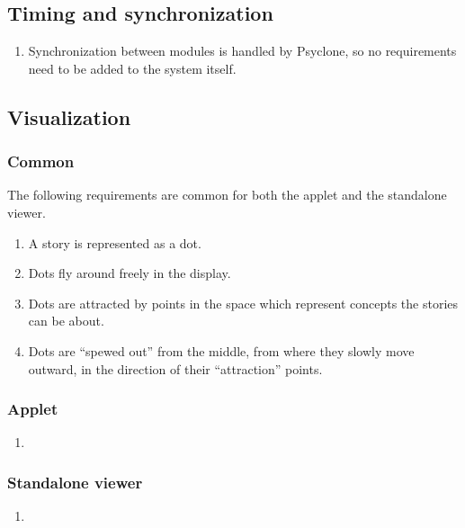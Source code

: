 \subsection{Timing and synchronization}

\begin{enumerate}
  \item Synchronization between modules is handled by Psyclone, so no
        requirements need to be added to the system itself.
\end{enumerate}

\subsection{Visualization}

\subsubsection{Common}

The following requirements are common for both the applet and the standalone
viewer.

\begin{enumerate}
  \item A story is represented as a dot.
  \item Dots fly around freely in the display.
  \item Dots are attracted by points in the space which represent concepts the
        stories can be about.
  \item Dots are ``spewed out'' from the middle, from where they slowly move
        outward, in the direction of their ``attraction'' points.
\end{enumerate}

\subsubsection{Applet}

\begin{enumerate}
  \item
\end{enumerate}

\subsubsection{Standalone viewer}

\begin{enumerate}
  \item
\end{enumerate}
